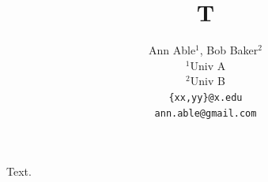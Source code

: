 \documentclass{article}
\title{T}
\author{Ann Able$^1$, Bob Baker$^2$ \\ $^1$Univ A \\ $^2$Univ B \\ \texttt{\{xx,yy\}@x.edu} \\ \texttt{ann.able@gmail.com}}
\begin{document}
\maketitle
Text.
\end{document}
